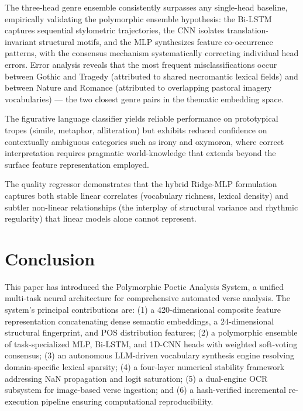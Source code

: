 \documentclass[conference]{IEEEtran}
\begin{document}
The three-head genre ensemble consistently surpasses any single-head
baseline, empirically validating the polymorphic ensemble hypothesis:
the Bi-LSTM captures sequential stylometric trajectories, the CNN
isolates translation-invariant structural motifs, and the MLP synthesizes
feature co-occurrence patterns, with the consensus mechanism
systematically correcting individual head errors. Error analysis reveals
that the most frequent misclassifications occur between Gothic and
Tragedy (attributed to shared necromantic lexical fields) and between
Nature and Romance (attributed to overlapping pastoral imagery
vocabularies) --- the two closest genre pairs in the thematic embedding
space.

The figurative language classifier yields reliable performance on
prototypical tropes (simile, metaphor, alliteration) but exhibits reduced
confidence on contextually ambiguous categories such as irony and
oxymoron, where correct interpretation requires pragmatic world-knowledge
that extends beyond the surface feature representation employed.

The quality regressor demonstrates that the hybrid Ridge-MLP formulation
captures both stable linear correlates (vocabulary richness, lexical
density) and subtler non-linear relationships (the interplay of structural
variance and rhythmic regularity) that linear models alone cannot
represent.

\section{Conclusion}
\label{sec:conclusion}

This paper has introduced the Polymorphic Poetic Analysis System, a
unified multi-task neural architecture for comprehensive automated verse
analysis. The system's principal contributions are: (1) a 420-dimensional
composite feature representation concatenating dense semantic embeddings,
a 24-dimensional structural fingerprint, and POS distribution features;
(2) a polymorphic ensemble of task-specialized MLP, Bi-LSTM, and 1D-CNN
heads with weighted soft-voting consensus; (3) an autonomous LLM-driven
vocabulary synthesis engine resolving domain-specific lexical sparsity;
(4) a four-layer numerical stability framework addressing NaN propagation
and logit saturation; (5) a dual-engine OCR subsystem for image-based
verse ingestion; and (6) a hash-verified incremental re-execution
pipeline ensuring computational reproducibility.
\end{document}
